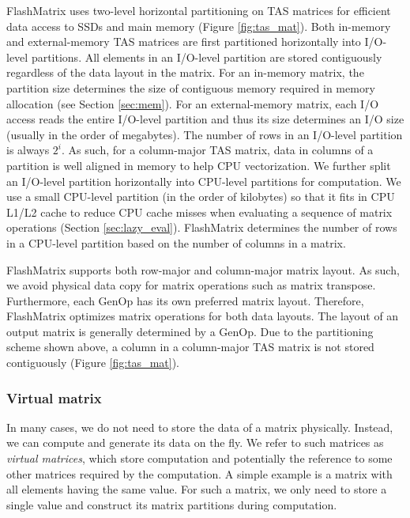 FlashMatrix uses two-level horizontal partitioning on TAS matrices for efficient
data access to SSDs and main memory (Figure \ref{fig:tas_mat}). Both in-memory
and external-memory TAS matrices are first partitioned horizontally into
I/O-level partitions. All elements in an I/O-level partition are stored
contiguously regardless of the data layout in the matrix. For an in-memory matrix,
the partition size determines the size of contiguous memory required in memory
allocation (see Section \ref{sec:mem}). For an external-memory matrix, each I/O
access reads the entire I/O-level partition and thus its size determines an I/O
size (usually in the order of megabytes). The number of rows in an I/O-level
partition is always $2^i$. As such, for a column-major TAS matrix, data in
columns of a partition is well aligned in memory to help CPU vectorization.
We further split an I/O-level partition
horizontally into CPU-level partitions for computation. We use a small
CPU-level partition (in the order of kilobytes) so that it fits in CPU L1/L2
cache to reduce CPU cache misses when evaluating a sequence of matrix
operations (Section \ref{sec:lazy_eval}). FlashMatrix determines the number
of rows in a CPU-level partition based on the number of columns in a matrix.


FlashMatrix supports both row-major and column-major matrix layout. As such,
we avoid physical data copy for matrix operations such as matrix transpose.
Furthermore, each GenOp has its own preferred matrix layout. Therefore,
FlashMatrix optimizes matrix operations for both data layouts. The layout
of an output matrix is generally determined by a GenOp. Due to
the partitioning scheme shown above, a column in a column-major TAS matrix
is not stored contiguously (Figure \ref{fig:tas_mat}). 

\subsubsection{Virtual matrix} \label{virt_mat}
In many cases, we do not need to store the data of a matrix physically. Instead,
we can compute and generate its data on the fly. We refer to such matrices as
\textit{virtual matrices}, which store computation and potentially the reference
to some other matrices required by the computation. A simple example is a matrix
with all elements having the same value. For such a matrix, we only need to store
a single value and construct its matrix partitions during computation.

